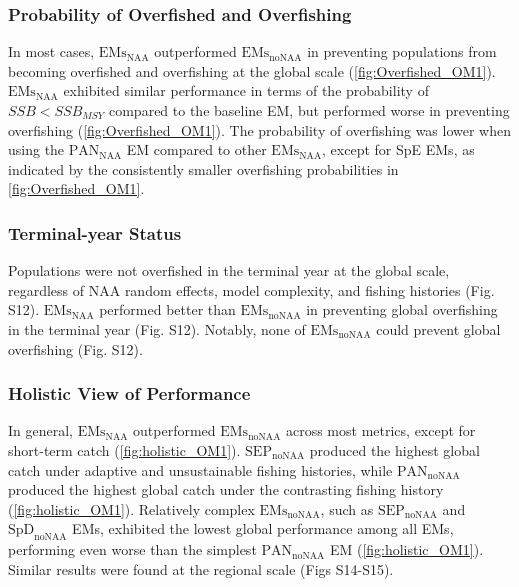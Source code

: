 \documentclass[
  12pt,
]{article}
\begin{document}
\hypertarget{probability-of-overfished-and-overfishing}{%
\subsubsection{Probability of Overfished and
Overfishing}\label{probability-of-overfished-and-overfishing}}

In most cases, \(\text{EMs}_{\scriptscriptstyle \text{NAA}}\)
outperformed \(\text{EMs}_{\scriptscriptstyle \text{noNAA}}\) in
preventing populations from becoming overfished and overfishing at the
global scale (\autoref{fig:Overfished_OM1}).
\(\text{EMs}_{\scriptscriptstyle \text{NAA}}\) exhibited similar
performance in terms of the probability of \({SSB} < {SSB_{MSY}}\)
compared to the baseline EM, but performed worse in preventing
overfishing (\autoref{fig:Overfished_OM1}). The probability of
overfishing was lower when using the
\(\text{PAN}_{\scriptscriptstyle \text{NAA}}\) EM compared to other
\(\text{EMs}_{\scriptscriptstyle \text{NAA}}\), except for SpE EMs, as
indicated by the consistently smaller overfishing probabilities in
\autoref{fig:Overfished_OM1}.

\hypertarget{terminal-year-status}{%
\subsubsection{Terminal-year Status}\label{terminal-year-status}}

Populations were not overfished in the terminal year at the global
scale, regardless of NAA random effects, model complexity, and fishing
histories (Fig. S12). \(\text{EMs}_{\scriptscriptstyle \text{NAA}}\)
performed better than \(\text{EMs}_{\scriptscriptstyle \text{noNAA}}\)
in preventing global overfishing in the terminal year (Fig. S12).
Notably, none of \(\text{EMs}_{\scriptscriptstyle \text{noNAA}}\) could
prevent global overfishing (Fig. S12).

\hypertarget{holistic-view-of-performance}{%
\subsubsection{Holistic View of
Performance}\label{holistic-view-of-performance}}

In general, \(\text{EMs}_{\scriptscriptstyle \text{NAA}}\) outperformed
\(\text{EMs}_{\scriptscriptstyle \text{noNAA}}\) across most metrics,
except for short-term catch (\autoref{fig:holistic_OM1}).
\(\text{SEP}_{\scriptscriptstyle \text{noNAA}}\) produced the highest
global catch under adaptive and unsustainable fishing histories, while
\(\text{PAN}_{\scriptscriptstyle \text{noNAA}}\) produced the highest
global catch under the contrasting fishing history
(\autoref{fig:holistic_OM1}). Relatively complex
\(\text{EMs}_{\scriptscriptstyle \text{noNAA}}\), such as
\(\text{SEP}_{\scriptscriptstyle \text{noNAA}}\) and
\(\text{SpD}_{\scriptscriptstyle \text{noNAA}}\) EMs, exhibited the
lowest global performance among all EMs, performing even worse than the
simplest \(\text{PAN}_{\scriptscriptstyle \text{noNAA}}\) EM
(\autoref{fig:holistic_OM1}). Similar results were found at the regional
scale (Figs S14-S15).
\end{document}
